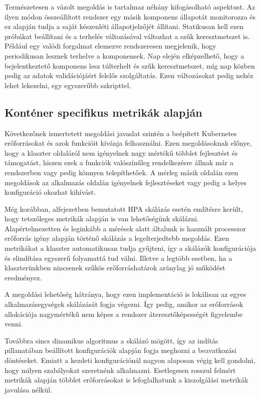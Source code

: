 Természetesen a vázolt megoldás is tartalmaz néhány kifogásolható aspektust. 
Az ilyen módon összeállított rendszer egy másik komponens állapotát monitorozza és ez alapján tudja a saját készenléti állapotjelzőjét állítani. 
Statikusan kell ezen próbákat beállítani és a terhelés változásával változhat a szűk keresztmetszet is.
Például egy valódi forgalmat elemezve rendszeresen megjelenik, hogy periodikusan lesznek terhelve a komponensek.
Nap elején elképzelhető, hogy a bejelentkeztető komponens lesz túlterhelt és szűk keresztmetszet, míg nap közben pedig az adatok validációjáért felelős szolgáltatás.
Ezen változásokat pedig nehéz lehet lekezelni, egy egyszerűbb szkripttel.


\subsection{Konténer specifikus metrikák alapján}
\label{subsec:container_metric_scaling}
Következőnek ismertetett megoldási javaslat szintén a beépített Kubernetes erőforrásokat és azok funkcióit kívánja felhasználni.
Ezen megoldásoknak előnye, hogy a klaszter oldaláról nem igényelnek nagy mértékű többlet fejlesztést és támogatást, hiszen ezek a funkciók valószínűleg rendelkezésre állnak már a rendszerben vagy pedig könnyen telepíthetőek.
A mérleg másik oldalán ezen megoldások az alkalmazás oldalán igényelnek fejlesztéseket vagy pedig a helyes konfiguráció okozhat kihívást.

Még korábban,  alfejezetben bemutatott HPA skálázás esetén említésre került, hogy tetszőleges metrikák alapján is van lehetőségünk skálázni.
Alapértelmezetten és leginkább a mérések alatt általunk is használt processzor erőforrás igény alapján történő skálázás a legelterjedtebb megoldás.
Ezen metrikákat a klaszter automatikusan tudja gyűjteni, így a skálázók konfigurációja és elindítása egyszerű folyamattá tud válni.
Illetve a legtöbb esetben, ha a klaszterünkben nincsenek szűkös erőforráshatárok aránylag jó működést eredményez.

A megoldási lehetőség hátránya, hogy ezen implementáció is lokálisan az egyes alkalmazásegységek skálázását fogja végezni.
Így pedig, amikor az erőforrások allokációja nagymértékű nem képes a rendszer áteresztőképességét figyelembe venni.

Továbbra sincs dinamikus algoritmus a skálázó mögött, így az indítás pillanatában beállított konfigurációk alapján fogja meghozni a beavatkozási döntéseket.
Emiatt a kezdeti konfigurációnál nagyon alaposan végig kell gondolni, hogy milyen szabályokat szeretnénk alkalmazni.
Esetlegesen rosszul felmért metrikák alapján többlet erőforrásokat is lefoglalhatunk a kiszolgálási metrikák javulása nélkül.

